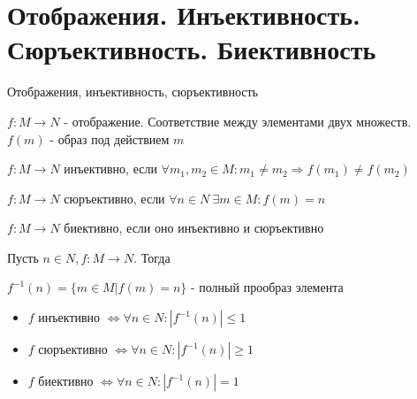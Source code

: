 \section{Отображения. Инъективность. Сюръективность. Биективность}
Отображения, инъективность, сюръективность
\begin{conj} 
    $f: M \to N$ - отображение. Соответствие между      элементами двух множеств. $f(m)$ - образ под действием $m$
\end{conj}
\begin{conj}
    $f: M \to N$ инъективно, если $\forall m_1, m_2 \in M : m_1\neq m_2 \Rightarrow f(m_1)\neq f(m_2)$
\end{conj}
\begin{conj}
    $f: M \to N$ сюръективно, если $\forall n \in N\ \exists m \in M : f(m) = n$
\end{conj}
\begin{conj}
    $f: M \to N$ биективно, если оно инъективно и сюръективно
\end{conj}
\begin{conj}
    Пусть $n\in N, f: M\to N$. Тогда 
    
    $f^{-1}(n) = \{m \in M | f(m)=n\}$ - полный прообраз элемента
\end{conj}
\begin{itemize}
    \item[] $f$ инъективно $\Leftrightarrow \forall n \in N : |f^{-1}(n)|\leq 1$
    
    \item[] $f$ сюръективно $\Leftrightarrow \forall n \in N : |f^{-1}(n)| \geq 1$
    
    \item[] $f$ биективно $\Leftrightarrow \forall n \in N : |f^{-1}(n)| = 1$
\end{itemize}